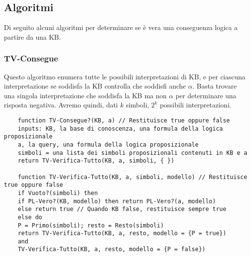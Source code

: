 \newpage
\subsection{Algoritmi}
Di seguito alcuni algoritmi per determinare se è vera una conseguenza logica a partire da una KB.
\subsubsection{TV-Consegue}
Questo algoritmo enumera tutte le possibili interpretazioni di KB, e per ciascuna interpretazione se soddisfa la KB controlla che soddisfi anche $\alpha$. Basta trovare una singola interpretazione che soddisfa la KB ma non $\alpha$ per determinare una risposta negativa. Avremo quindi, dati $k$ simboli, $2^k$ possibili interpretazioni.
\label{alg:tv_consegue}
\begin{lstlisting}
	function TV-Consegue?(KB, a) // Restituisce true oppure false
	inputs: KB, la base di conoscenza, una formula della logica proposizionale
	a, la query, una formula della logica proposizionale
	simboli = una lista dei simboli proposizionali contenuti in KB e a
	return TV-Verifica-Tutto(KB, a, simboli, { })
	
	function TV-Verifica-Tutto(KB, a, simboli, modello) // Restituisce true oppure false
	if Vuoto?(simboli) then
	if PL-Vero?(KB, modello) then return PL-Vero?(a, modello)
	else return true // Quando KB false, restituisce sempre true
	else do
	P = Primo(simboli); resto = Resto(simboli)
	return TV-Verifica-Tutto(KB, a, resto, modello = {P = true})
	and
	TV-Verifica-Tutto(KB, a, resto, modello = {P = false})
\end{lstlisting}

